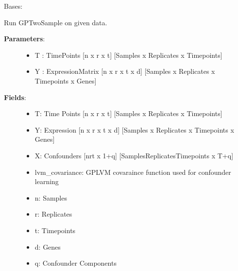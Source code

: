 \documentclass[letterpaper,10pt,english]{sphinxmanual}
\begin{document}
\begin{fulllineitems}
\label{base:gptwosample.twosample.twosample.TwoSample}
Bases: 

Run GPTwoSample on given data.
\begin{description}
\item[{\textbf{Parameters}:}] \leavevmode\begin{itemize}
\item {} 
T : TimePoints {[}n x r x t{]}    {[}Samples x Replicates x Timepoints{]}

\item {} 
Y : ExpressionMatrix {[}n x r x t x d{]}      {[}Samples x Replicates x Timepoints x Genes{]}

\end{itemize}

\item[{\textbf{Fields}:}] \leavevmode\begin{itemize}
\item {} 
T: Time Points {[}n x r x t{]} {[}Samples x Replicates x Timepoints{]}

\item {} 
Y: Expression {[}n x r x t x d{]} {[}Samples x Replicates x Timepoints x Genes{]}

\item {} 
X: Confounders {[}nrt x 1+q{]} {[}SamplesReplicatesTimepoints x T+q{]}

\item {} 
lvm\_covariance: GPLVM covaraince function used for confounder learning

\item {} 
n: Samples

\item {} 
r: Replicates

\item {} 
t: Timepoints

\item {} 
d: Genes

\item {} 
q: Confounder Components

\end{itemize}

\end{description}


\end{fulllineitems}
\end{document}
